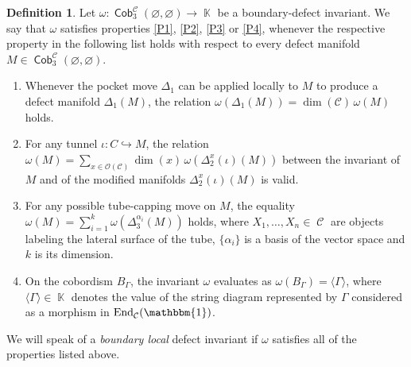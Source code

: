 \documentclass[10pt,a4paper]{amsart}
\DeclareMathOperator{\End}{End}
\DeclareMathOperator{\Hom}{Hom}
\DeclareMathOperator{\K}{\mathbb{K}}
\DeclareMathOperator{\Cob}{\mathsf{Cob}}
\DeclareMathOperator{\calc}{\mathcal{C}}
\numberwithin{equation}{section}
\theoremstyle{definition}
\newtheorem{Definition}[Definition]{Definition}
\begin{document}
\begin{Definition} \label{defPropInv}
Let $\omega\colon \Cob_3^{\calc}(\varnothing, \varnothing) \rightarrow \K $ be a boundary-defect invariant. We say that $\omega$ satisfies properties \ref{P1}, \ref{P2}, \ref{P3} or \ref{P4}, whenever the respective property in the following list holds with respect to every defect manifold $M \in \Cob_3^{\calc}(\varnothing, \varnothing)$.
 \begin{enumerate}[(P1)]\itemsep=0pt
 \item \label{P1} Whenever the pocket move $\Delta_1$ can be applied locally to $M$ to produce a defect manifold $\Delta_1(M)$, the relation $\omega(\Delta_1(M)) = \dim (\mathcal{C})\, \omega(M)$ holds.
 \item \label{P2} For any tunnel $\iota\colon C \hookrightarrow M$, the relation $\omega(M) = \sum_{x \in \mathcal{O}(\mathcal{C})}\dim(x) \, \omega(\Delta_2^x(\iota)(M))$ between the invariant of $M$ and of the modified manifolds $\Delta_2^x(\iota)(M)$ is valid.
 \item \label{P3} For any possible tube-capping move on $M$, the equality $\omega(M) = \sum_{i = 1}^{k}\omega(\Delta_3^{\alpha_i}(M))$ holds, where $X_1, \dots, X_n \in \calc$ are objects labeling the lateral surface of the tube, $\{\alpha_i\}$ is a basis of the vector space \smash{$\Hom_{\calc}\bigl(X_1^{\varepsilon(1)} \otimes \dots \otimes X_n^{\varepsilon(n)}, \mathbbm{1}\bigr)$} and $k$ is its dimension.
 \item \label{P4} On the cobordism $B_\Gamma$, the invariant $\omega$ evaluates as $\omega(B_{\Gamma}) = \langle \Gamma \rangle$, where $\langle \Gamma \rangle \in \K$ denotes the value of the string diagram represented by $\Gamma$ considered as a morphism in $\End_{\calc}(\mathbbm{1})$.
 \end{enumerate}
 We will speak of a \textit{boundary local} defect invariant if $\omega$ satisfies all of the properties listed above.
\end{Definition}
\end{document}
